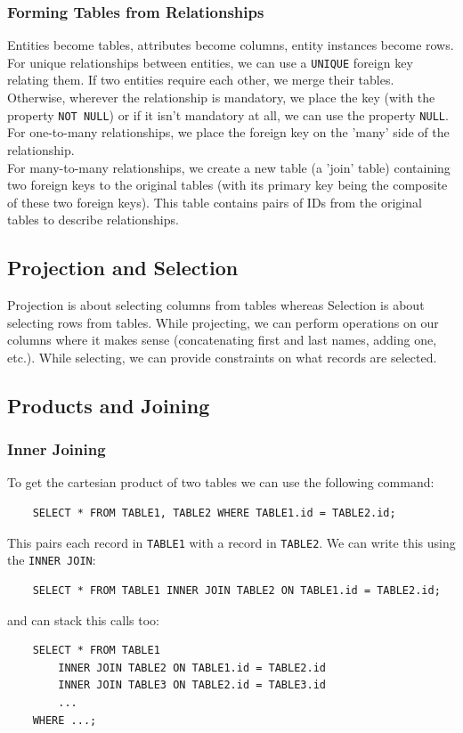 \subsubsection{Forming Tables from Relationships}

Entities become tables, attributes become columns, entity instances
become rows. 
\\[\baselineskip]
For unique relationships between entities, we
can use a \texttt{UNIQUE} foreign key relating them. 
If two entities require each other, we merge their tables. 
Otherwise, wherever the relationship is mandatory, we place the key
(with the property \texttt{NOT NULL}) or if it isn't mandatory at all,
we can use the property \texttt{NULL}.
\\[\baselineskip]
For one-to-many relationships, we place the foreign key on the
'many' side of the relationship.
\\[\baselineskip]
For many-to-many relationships, we create a new table (a 'join' table)
containing two foreign keys to the original tables (with its 
primary key being the composite of these two foreign keys).
This table contains pairs of IDs from the original tables to 
describe relationships.

\subsection{Projection and Selection}

Projection is about selecting columns from tables whereas 
Selection is about selecting rows from tables. While
projecting, we can perform operations on our columns where
it makes sense (concatenating first and last names, adding
one, etc.). While selecting, we can provide constraints on
what records are selected.

\subsection{Products and Joining}

\subsubsection{Inner Joining}

To get the cartesian product of two tables we can use the following
command: \begin{lstlisting}
    SELECT * FROM TABLE1, TABLE2 WHERE TABLE1.id = TABLE2.id;
\end{lstlisting} This pairs each record in \texttt{TABLE1} with
a record in \texttt{TABLE2}. We can write this using the 
\texttt{INNER JOIN}: \begin{lstlisting}
    SELECT * FROM TABLE1 INNER JOIN TABLE2 ON TABLE1.id = TABLE2.id;
\end{lstlisting} and can stack this calls too: \begin{lstlisting}
    SELECT * FROM TABLE1
        INNER JOIN TABLE2 ON TABLE1.id = TABLE2.id
        INNER JOIN TABLE3 ON TABLE2.id = TABLE3.id
        ...
    WHERE ...;
\end{lstlisting} 

